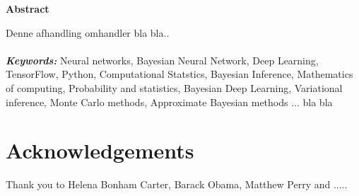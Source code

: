 \documentclass[a4paper]{book}
\providecommand{\keywords}[1]
{
  \small	
  \textbf{\textit{Keywords:}} #1
}
\numberwithin{mytheorem}{chapter}
\numberwithin{equation}{section}
\begin{document}
\thispagestyle{empty}
\begin{center}
    \Large
    \textbf{Abstract}
\end{center}
\vspace{0.9cm}
Denne afhandling omhandler bla bla.. %
\\
\\
\keywords{Neural networks, Bayesian Neural Network, Deep Learning, TensorFlow, Python, Computational Statstics, Bayesian Inference, Mathematics of computing, Probability and statistics, Bayesian Deep Learning, Variational inference, Monte Carlo methods, Approximate Bayesian methods ...  bla bla}
\frontmatter

\section*{Acknowledgements}
\thispagestyle{empty}
Thank you to Helena Bonham Carter, Barack Obama, Matthew Perry and ..... 


\tableofcontents \thispagestyle{empty} 
\listoffigures \thispagestyle{empty} 
\listoftables \thispagestyle{empty} 
\newpage


\mainmatter















\nocite{*}


\end{document}

